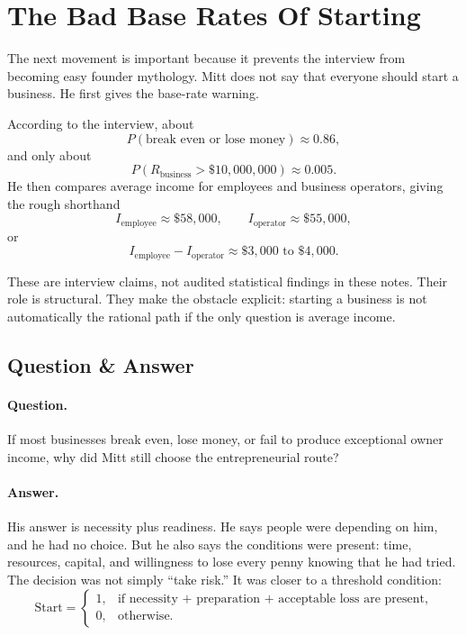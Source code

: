 \section{The Bad Base Rates Of Starting}

The next movement is important because it prevents the interview from becoming easy founder mythology. Mitt does not say that everyone should start a business. He first gives the base-rate warning.

According to the interview, about
\begin{equation}
P(\text{break even or lose money}) \approx 0.86,
\end{equation}
and only about
\begin{equation}
P(R_{\text{business}} > \$10{,}000{,}000) \approx 0.005.
\end{equation}
He then compares average income for employees and business operators, giving the rough shorthand
\begin{equation}
I_{\text{employee}} \approx \$58{,}000,\qquad
I_{\text{operator}} \approx \$55{,}000,
\end{equation}
or
\begin{equation}
I_{\text{employee}} - I_{\text{operator}}
\approx \$3{,}000\text{ to }\$4{,}000.
\end{equation}

These are interview claims, not audited statistical findings in these notes. Their role is structural. They make the obstacle explicit: starting a business is not automatically the rational path if the only question is average income.

\subsection{Question \& Answer}

\paragraph{Question.}
If most businesses break even, lose money, or fail to produce exceptional owner income, why did Mitt still choose the entrepreneurial route?

\paragraph{Answer.}
His answer is necessity plus readiness. He says people were depending on him, and he had no choice. But he also says the conditions were present: time, resources, capital, and willingness to lose every penny knowing that he had tried. The decision was not simply ``take risk.'' It was closer to a threshold condition:
\begin{equation}
\text{Start} =
\begin{cases}
1, & \text{if necessity + preparation + acceptable loss are present},\\
0, & \text{otherwise.}
\end{cases}
\end{equation}

